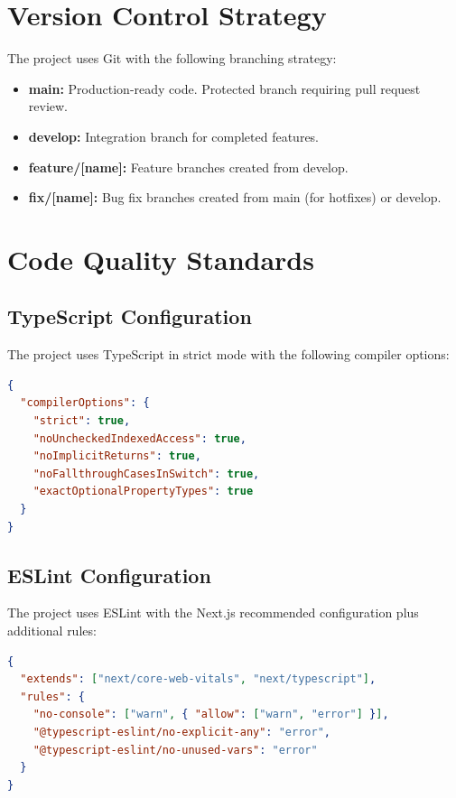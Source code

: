 \documentclass[12pt,a4paper]{report}
\begin{document}
\section{Version Control Strategy}

The project uses Git with the following branching strategy:

\begin{itemize}[leftmargin=1.5em]
  \item \textbf{main:} Production-ready code. Protected branch requiring pull request review.
  \item \textbf{develop:} Integration branch for completed features.
  \item \textbf{feature/[name]:} Feature branches created from develop.
  \item \textbf{fix/[name]:} Bug fix branches created from main (for hotfixes) or develop.
\end{itemize}

\section{Code Quality Standards}

\subsection{TypeScript Configuration}

The project uses TypeScript in strict mode with the following compiler options:

\begin{lstlisting}[language=JSON,caption={tsconfig.json strict settings}]
{
  "compilerOptions": {
    "strict": true,
    "noUncheckedIndexedAccess": true,
    "noImplicitReturns": true,
    "noFallthroughCasesInSwitch": true,
    "exactOptionalPropertyTypes": true
  }
}
\end{lstlisting}

\subsection{ESLint Configuration}

The project uses ESLint with the Next.js recommended configuration plus additional rules:

\begin{lstlisting}[language=JSON,caption={.eslintrc.json}]
{
  "extends": ["next/core-web-vitals", "next/typescript"],
  "rules": {
    "no-console": ["warn", { "allow": ["warn", "error"] }],
    "@typescript-eslint/no-explicit-any": "error",
    "@typescript-eslint/no-unused-vars": "error"
  }
}
\end{lstlisting}
\end{document}
